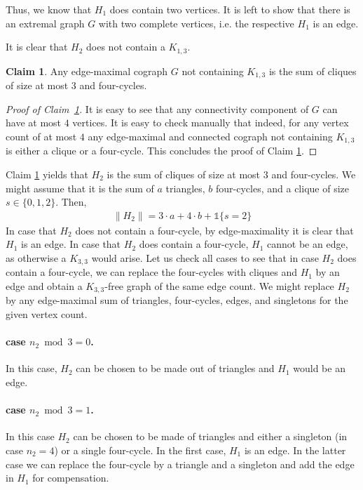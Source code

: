 \documentclass{article}
\theoremstyle{definition}
\theoremstyle{definition}
\theoremstyle{definition}
\theoremstyle{definition}
\theoremstyle{definition}
\theoremstyle{definition}
\newtheorem{Claim}{Claim}
\theoremstyle{definition}
\theoremstyle{definition}
\theoremstyle{definition}
\theoremstyle{definition}
\newenvironment{proofref}[2]{%
  \begin{proof}[Proof of #1~\ref{#2}]%
}{%
  \end{proof}%
}
\begin{document}
        Thus, we know that $H_1$ does contain two vertices. It is left to show that there is an extremal graph $G$ with two complete vertices, i.e. the respective $H_1$ is an edge.

        It is clear that $H_2$ does not contain a $K_{1,3}$.
        \begin{Claim} \label{claim:13}
            Any edge-maximal cograph $G$ not containing $K_{1,3}$ is the sum of cliques of size at most $3$ and four-cycles.
        \end{Claim}

        \begin{proofref}{Claim}{claim:13}
            It is easy to see that any connectivity component of $G$ can have at most $4$ vertices. It is easy to check manually that indeed, for any vertex count of at most $4$ any edge-maximal and connected cograph not containing $K_{1,3}$ is either a clique or a four-cycle.
            This concludes the proof of Claim \ref{claim:13}.
        \end{proofref}

        Claim \ref{claim:13} yields that $H_2$ is the sum of cliques of size at most $3$ and four-cycles.
        We might assume that it is the sum of $a$ triangles, $b$ four-cycles, and a clique of size $s \in \{ 0, 1, 2 \}$.
        Then,
        \begin{align}
            \| H_2 \| = 3 \cdot a + 4 \cdot b + \mathbb{1}\{ s = 2 \}
        \end{align}
        In case that $H_2$ does not contain a four-cycle, by edge-maximality it is clear that $H_1$ is an edge.
        In case that $H_2$ does contain a four-cycle, $H_1$ cannot be an edge, as otherwise a $K_{3,3}$ would arise.
        Let us check all cases to see that in case $H_2$ does contain a four-cycle, we can replace the four-cycles with cliques and $H_1$ by an edge and obtain a $K_{3,3}$-free graph of the same edge count. We might replace $H_2$ by any edge-maximal sum of triangles, four-cycles, edges, and singletons for the given vertex count.

        \paragraph{case $n_2 \bmod 3 = 0$.} In this case, $H_2$ can be chosen to be made out of triangles and $H_1$ would be an edge.

        \paragraph{case $n_2 \bmod 3 = 1$.} In this case $H_2$ can be chosen to be made of triangles and either a singleton (in case $n_2 = 4$) or a single four-cycle. In the first case, $H_1$ is an edge. In the latter case we can replace the four-cycle by a triangle and a singleton and add the edge in $H_1$ for compensation.
\end{document}
